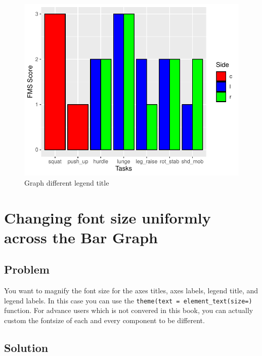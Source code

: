 \documentclass[
]{book}
\begin{document}
\begin{figure}

{\centering \includegraphics{se201_stats_book_files/figure-latex/FIG-BAR-GRAPH-LEGEND-1} 

}

\caption[Graph different legend title]{Graph different legend title}\label{fig:FIG-BAR-GRAPH-LEGEND}
\end{figure}

\hypertarget{BAR-GRAPH-FONTSIZE}{%
\section{Changing font size uniformly across the Bar Graph}\label{BAR-GRAPH-FONTSIZE}}

\hypertarget{problem-20}{%
\subsection{Problem}\label{problem-20}}

You want to magnify the font size for the axes titles, axes labels, legend title, and legend labels. In this case you can use the \texttt{theme(text\ =\ element\_text(size=)} function. For advance users which is not convered in this book, you can actually custom the fontsize of each and every component to be different.

\hypertarget{solution-20}{%
\subsection{Solution}\label{solution-20}}
\end{document}
